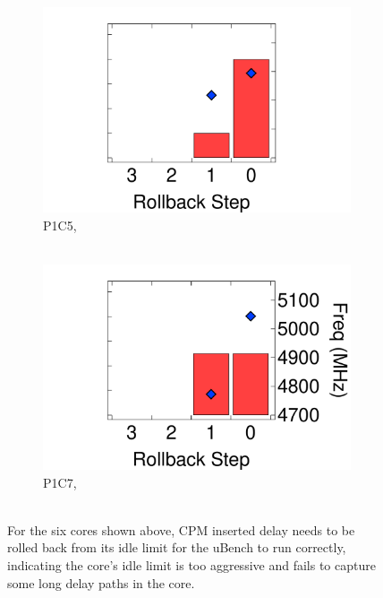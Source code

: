 \begin{figure}[t]
\begin{subfigure}{.132\linewidth}
        \includegraphics[trim=130 0 150 0,clip,width=\linewidth]{graphs/process/ubench-limit-dist/int-limit-dist-p1c5.pdf}
        \setlength{\abovecaptionskip}{-9pt}
        \caption{P1C5, \\~~~~~}
    \end{subfigure}
    \hfill
    \begin{subfigure}{.186\linewidth}
        \includegraphics[trim=130 0 0 0,clip,width=\linewidth]{graphs/process/ubench-limit-dist/int-limit-dist-p1c7.pdf}
        \setlength{\abovecaptionskip}{-9pt}
        \caption{P1C7, \\~~~~~}
    \end{subfigure}
    \caption{For the six cores shown above, CPM inserted delay needs to be rolled back from its idle limit for the uBench to run correctly, indicating the core's idle limit is too aggressive and fails to capture some long delay paths in the core.}
    \label{fig:ubench-limit-dist} 
    \vspace{-0.3cm}
\end{figure}
